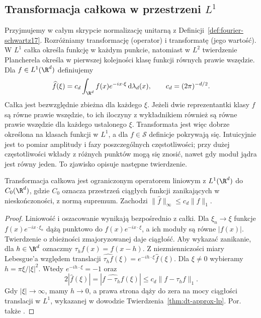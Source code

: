 \subsection{Transformacja całkowa w przestrzeni \texorpdfstring{$L^1$}{L1}}

Przyjmujemy w całym skrypcie normalizację unitarną z
Definicji~\ref{def:fourier-schwartz17}. Rozróżniamy
transformację (operator) i transformatę (jego wartość).
W $L^1$ całka określa funkcję w każdym punkcie, natomiast
w $L^2$ twierdzenie Plancherela określa w pierwszej
kolejności klasę funkcji równych prawie wszędzie.
Dla $f\in L^1(\R^d)$ definiujemy
\[
 \widehat f(\xi)=c_d\int_{\R^d}f(x)e^{-ix\cdot\xi}
 \,\mathrm d\lambda_d(x),\qquad c_d=(2\pi)^{-d/2}.
\]
Całka jest bezwzględnie zbieżna dla każdego $\xi$.
Jeżeli dwie reprezentantki klasy $f$ są równe prawie
wszędzie, to ich iloczyny z wykładnikiem również
są równe prawie wszędzie dla każdego ustalonego $\xi$.
Transformata jest więc dobrze określona na klasach
funkcji w $L^1$, a dla $f\in\mathcal S$ definicje
pokrywają się.
Intuicyjnie jest to pomiar amplitudy i fazy poszczególnych
częstotliwości; przy dużej częstotliwości wkłady z różnych
punktów mogą się znosić, nawet gdy moduł jądra jest równy
jeden. To zjawisko opisuje następne twierdzenie.

\begin{twierdzenie}
\label{thm:dt-fourier-l1-rl}
Transformacja całkowa jest ograniczonym operatorem
liniowym z $L^1(\R^d)$ do $C_0(\R^d)$, gdzie $C_0$
oznacza przestrzeń ciągłych funkcji zanikających w
nieskończoności, z normą supremum. Zachodzi
$\|\widehat f\|_\infty\le c_d\|f\|_1$.
\end{twierdzenie}
\begin{proof}
Liniowość i oszacowanie wynikają bezpośrednio z całki.
Dla $\xi_n\to\xi$ funkcje
$f(x)e^{-ix\cdot\xi_n}$ dążą punktowo do
$f(x)e^{-ix\cdot\xi}$, a ich moduły są równe $|f(x)|$.
Twierdzenie o zbieżności zmajoryzowanej daje ciągłość.
Aby wykazać zanikanie, dla $h\in\R^d$ oznaczmy
$\tau_h f(x)=f(x-h)$. Z niezmienniczości miary
Lebesgue'a względem translacji
$\widehat{\tau_h f}(\xi)=e^{-ih\cdot\xi}\widehat f(\xi)$.
Dla $\xi\ne0$ wybieramy $h=\pi\xi/|\xi|^2$.
Wtedy $e^{-ih\cdot\xi}=-1$ oraz
\[
 2|\widehat f(\xi)|
 =|\widehat{f-\tau_h f}(\xi)|
 \le c_d\|f-\tau_h f\|_1.
\]
Gdy $|\xi|\to\infty$, mamy $h\to0$, a prawa strona
dąży do zera na mocy ciągłości translacji w $L^1$,
wykazanej w dowodzie Twierdzenia~\ref{thm:dt-approx-lp}.
Por. także
.
\end{proof}

